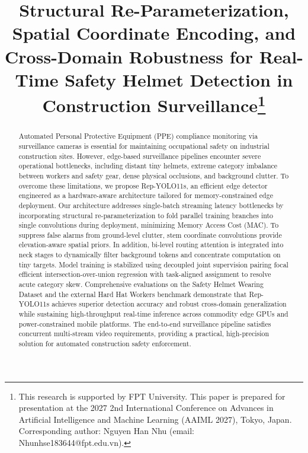 \documentclass[conference]{IEEEtran}
\begin{document}
\title{Structural Re-Parameterization, Spatial Coordinate Encoding, and Cross-Domain Robustness for Real-Time Safety Helmet Detection in Construction Surveillance\thanks{This research is supported by FPT University. This paper is prepared for presentation at the 2027 2nd International Conference on Advances in Artificial Intelligence and Machine Learning (AAIML 2027), Tokyo, Japan. Corresponding author: Nguyen Han Nhu (email: Nhunhse183644@fpt.edu.vn).}}

\author{
}

\maketitle

\begin{abstract}
Automated Personal Protective Equipment (PPE) compliance monitoring via surveillance cameras is essential for maintaining occupational safety on industrial construction sites. However, edge-based surveillance pipelines encounter severe operational bottlenecks, including distant tiny helmets, extreme category imbalance between workers and safety gear, dense physical occlusions, and background clutter. To overcome these limitations, we propose Rep-YOLO11s, an efficient edge detector engineered as a hardware-aware architecture tailored for memory-constrained edge deployment. Our architecture addresses single-batch streaming latency bottlenecks by incorporating structural re-parameterization to fold parallel training branches into single convolutions during deployment, minimizing Memory Access Cost (MAC). To suppress false alarms from ground-level clutter, stem coordinate convolutions provide elevation-aware spatial priors. In addition, bi-level routing attention is integrated into neck stages to dynamically filter background tokens and concentrate computation on tiny targets. Model training is stabilized using decoupled joint supervision pairing focal efficient intersection-over-union regression with task-aligned assignment to resolve acute category skew. Comprehensive evaluations on the Safety Helmet Wearing Dataset and the external Hard Hat Workers benchmark demonstrate that Rep-YOLO11s achieves superior detection accuracy and robust cross-domain generalization while sustaining high-throughput real-time inference across commodity edge GPUs and power-constrained mobile platforms. The end-to-end surveillance pipeline satisfies concurrent multi-stream video requirements, providing a practical, high-precision solution for automated construction safety enforcement.
\end{abstract}
\end{document}
